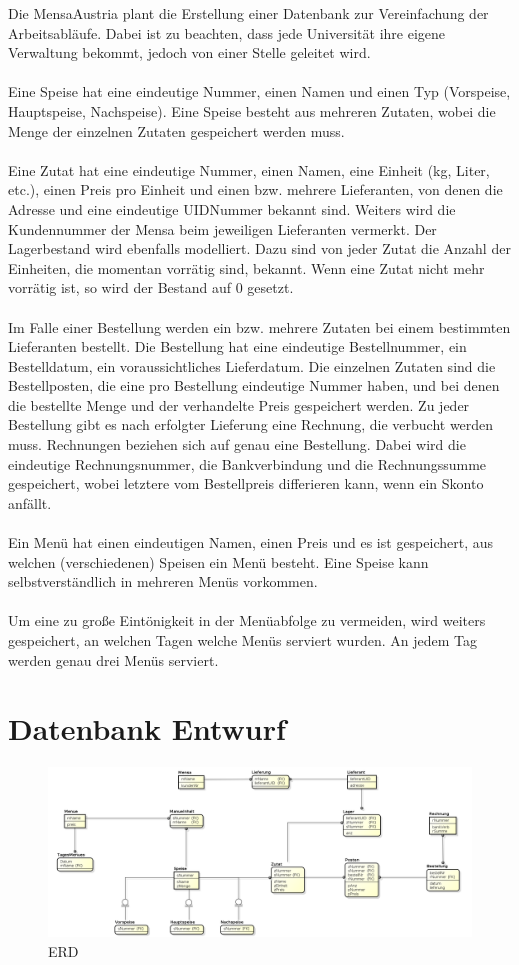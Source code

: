 \documentclass[12pt,a4paper]{report}
\begin{document}
	Die MensaAustria plant die Erstellung einer Datenbank zur Vereinfachung der Arbeitsabläufe. Dabei
	ist zu beachten, dass jede Universität ihre eigene Verwaltung bekommt, jedoch von einer Stelle
	geleitet wird.\\\\
	Eine Speise hat eine eindeutige Nummer, einen Namen und einen Typ (Vorspeise, Hauptspeise,
	Nachspeise). Eine Speise besteht aus mehreren Zutaten, wobei die Menge der einzelnen Zutaten
	gespeichert werden muss.\\\\
	Eine Zutat hat eine eindeutige Nummer, einen Namen, eine Einheit (kg, Liter, etc.), einen Preis pro
	Einheit und einen bzw. mehrere Lieferanten, von denen die Adresse und eine eindeutige
	UIDNummer bekannt sind. Weiters wird die Kundennummer der Mensa beim jeweiligen Lieferanten
	vermerkt. Der Lagerbestand wird ebenfalls modelliert. Dazu sind von jeder Zutat die Anzahl der
	Einheiten, die momentan vorrätig sind, bekannt. Wenn eine Zutat nicht mehr vorrätig ist, so wird der
	Bestand auf 0 gesetzt.\\\\
	Im Falle einer Bestellung werden ein bzw. mehrere Zutaten bei einem bestimmten Lieferanten
	bestellt. Die Bestellung hat eine eindeutige Bestellnummer, ein Bestelldatum, ein voraussichtliches
	Lieferdatum. Die einzelnen Zutaten sind die Bestellposten, die eine pro Bestellung eindeutige
	Nummer haben, und bei denen die bestellte Menge und der verhandelte Preis gespeichert werden.
	Zu jeder Bestellung gibt es nach erfolgter Lieferung eine Rechnung, die verbucht werden muss.
	Rechnungen beziehen sich auf genau eine Bestellung. Dabei wird die eindeutige Rechnungsnummer,
	die Bankverbindung und die Rechnungssumme gespeichert, wobei letztere vom Bestellpreis
	differieren kann, wenn ein Skonto anfällt.\\\\
	Ein Menü hat einen eindeutigen Namen, einen Preis und es ist gespeichert, aus welchen
	(verschiedenen) Speisen ein Menü besteht. Eine Speise kann selbstverständlich in mehreren Menüs
	vorkommen.\\\\
	Um eine zu große Eintönigkeit in der Menüabfolge zu vermeiden, wird weiters gespeichert, an
	welchen Tagen welche Menüs serviert wurden. An jedem Tag werden genau drei Menüs serviert.
	\chapter{Datenbank Entwurf}
		\begin{figure}[h!]
			\centering
			\includegraphics[width=1\linewidth]{ERD/MensaEr.png}
			\caption{ERD}
			\label{fig:MensaEr.png}
		\end{figure}
\end{document}
